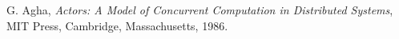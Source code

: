  
\begin{singlespace}
\begin{thebibliography}{99}
G. Agha, \emph{Actors: A Model of Concurrent Computation in 
Distributed Systems}, MIT Press, Cambridge, Massachusetts,
1986.	
\end{thebibliography}
\end{singlespace}


